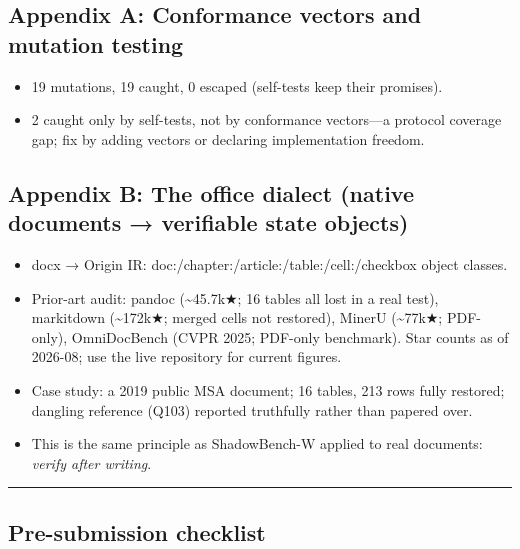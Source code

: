 \documentclass[
  english,
]{article}
\providecommand{\tightlist}{%
  \setlength{\itemsep}{0pt}\setlength{\parskip}{0pt}}
\begin{document}
\subsection{Appendix A: Conformance vectors and mutation
testing}\label{appendix-a-conformance-vectors-and-mutation-testing}

\begin{itemize}
\tightlist
\item
  19 mutations, 19 caught, 0 escaped (self-tests keep their promises).
\item
  2 caught only by self-tests, not by conformance vectors---a protocol
  coverage gap; fix by adding vectors or declaring implementation
  freedom.
\end{itemize}

\subsection{Appendix B: The office dialect (native documents →
verifiable state
objects)}\label{appendix-b-the-office-dialect-native-documents-verifiable-state-objects}

\begin{itemize}
\tightlist
\item
  docx → Origin IR: doc:/chapter:/article:/table:/cell:/checkbox object
  classes.
\item
  Prior-art audit: pandoc (\textasciitilde45.7k★; 16 tables all lost in
  a real test), markitdown (\textasciitilde172k★; merged cells not
  restored), MinerU (\textasciitilde77k★; PDF-only), OmniDocBench (CVPR
  2025; PDF-only benchmark). Star counts as of 2026-08; use the live
  repository for current figures.
\item
  Case study: a 2019 public MSA document; 16 tables, 213 rows fully
  restored; dangling reference (Q103) reported truthfully rather than
  papered over.
\item
  This is the same principle as ShadowBench-W applied to real documents:
  \emph{verify after writing}.
\end{itemize}

\begin{center}\rule{0.5\linewidth}{0.5pt}\end{center}

\subsection{Pre-submission checklist}\label{pre-submission-checklist}
\end{document}
